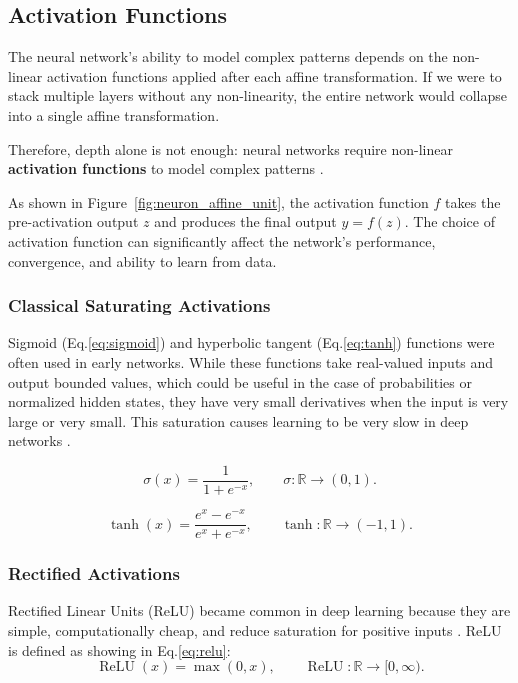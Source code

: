 \subsection{Activation Functions}

The neural network's ability to model complex patterns depends on the non-linear activation functions applied after each affine transformation. If we were to stack multiple layers without any non-linearity, the entire network would collapse into a single affine transformation.

Therefore, depth alone is not enough: neural networks require non-linear \textbf{activation functions} to model complex patterns \cite{Goodfellow2016}.

As shown in Figure~\ref{fig:neuron_affine_unit}, the activation function $f$ takes the pre-activation output $z$ and produces the final output $y=f(z)$. The choice of activation function can significantly affect the network's performance, convergence, and ability to learn from data.
\subsubsection{Classical Saturating Activations}

Sigmoid (Eq.\eqref{eq:sigmoid}) and hyperbolic tangent (Eq.\eqref{eq:tanh}) functions were often used in early networks. While these functions take real-valued inputs and output bounded values, which could be useful in the case of probabilities or normalized hidden states, they have very small derivatives when the input is very large or very small. This saturation causes learning to be very slow in deep networks \cite{Glorot2010,Goodfellow2016}.

\begin{equation}
    \label{eq:sigmoid}
    \sigma(x)=\frac{1}{1+e^{-x}}, \qquad \sigma:\mathbb{R}\rightarrow(0,1).
\end{equation}

\begin{equation}
    \label{eq:tanh}
    \tanh(x)=\frac{e^x-e^{-x}}{e^x+e^{-x}}, \qquad \tanh:\mathbb{R}\rightarrow(-1,1).
\end{equation}

\subsubsection{Rectified Activations}

Rectified Linear Units (ReLU) became common in deep learning because they are simple, computationally cheap, and reduce saturation for positive inputs \cite{Nair2010}. ReLU is defined as showing in Eq.\eqref{eq:relu}:
\begin{equation}
    \label{eq:relu}
    \operatorname{ReLU}(x)=\max(0,x), \qquad \operatorname{ReLU}:\mathbb{R}\rightarrow[0,\infty).
\end{equation}

